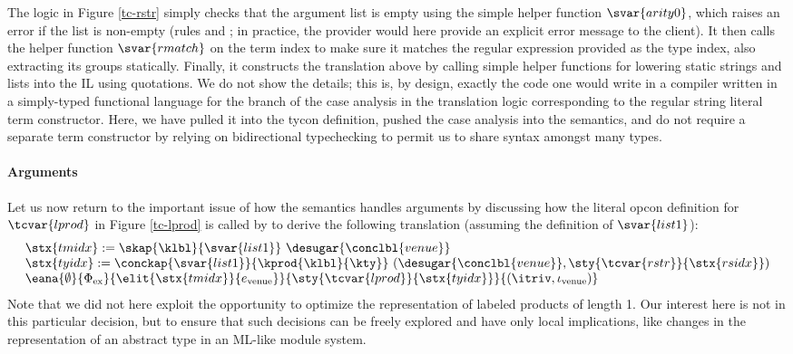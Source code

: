 The logic in Figure \ref{tc-rstr} simply checks that the argument list is empty using the simple helper function $\svar{arity0}$, which raises an error if the list is non-empty (rules  and ; in practice, the provider would here provide an explicit error message to the client). It then calls the helper function $\svar{rmatch}$ on the term index to make sure it matches the regular expression provided as the type index, also extracting its groups statically. Finally, it constructs the translation above by calling simple helper functions for lowering static strings and lists into the IL using quotations. We do not show the details; this is, by design, exactly the code one would write in a compiler written in a simply-typed functional language for the branch of the case analysis in the translation logic corresponding to the regular string literal term constructor. Here, we have pulled it into the tycon definition, pushed the case analysis into the semantics, and do not require a separate term constructor by relying on bidirectional typechecking to permit us to share syntax amongst many types.%

\paragraph{Arguments} Let us now return to the important issue of how the semantics handles arguments by discussing how the literal opcon definition for $\tcvar{lprod}$ in Figure \ref{tc-lprod} is called by  to derive the following translation (assuming the definition of $\svar{list1}$):
\[\begin{array}{l}
\stx{tmidx} := \skap{\klbl}{\svar{list1}}~\desugar{\conclbl{venue}}\\
\stx{tyidx} := \conckap{\svar{list1}}{\kprod{\klbl}{\kty}}~(\desugar{\conclbl{venue}}, \sty{\tcvar{rstr}}{\stx{rsidx}})\\
\eana{\emptyset}{\Phi_\text{ex}}{\elit{\stx{tmidx}}{e_\text{venue}}}{\sty{\tcvar{lprod}}{\stx{tyidx}}}{\ipair{\itriv}{\iota_\text{venue}}}
\end{array}\]
\normalsize
Note that we did not here exploit the opportunity to optimize the representation of labeled products of length 1. Our interest here is not in this particular decision,  but to ensure that such decisions can be freely explored and have only local implications, like changes in the representation of an abstract type in an ML-like module system. 

